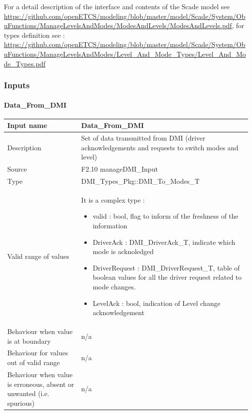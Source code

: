 For a detail description of the interface and contents of the Scade model see \url{https://github.com/openETCS/modeling/blob/master/model/Scade/System/ObuFunctions/ManageLevelsAndModes/ModesAndLevels/ModesAndLevels.pdf}, for types definition see : \url{https://github.com/openETCS/modeling/blob/master/model/Scade/System/ObuFunctions/ManageLevelsAndModes/Level_And_Mode_Types/Level_And_Mode_Types.pdf}

\subsubsection{Inputs}\label{s:mode_and_level_inputs}



\paragraph{Data\_From\_DMI}

\begin{longtable}{p{}p{}}
\toprule
Input name				& Data\_From\_DMI \\
\midrule
Description				& Set of data transmitted from DMI  (driver acknowledgements and requests to  switch modes and level) \\
\midrule
Source					& F2.10 manageDMI\_Input \\ 
\midrule
Type					& DMI\_Types\_Pkg::DMI\_To\_Modes\_T \\
\midrule
Valid range of values	& It is a complex type : 
\begin{itemize}
\item valid :  bool,  flag to inform of the freshness of the information
\item DriverAck : DMI\_DriverAck\_T, indicate which mode is acknoledged
\item DriverRequest : DMI\_DriverRequest\_T, table of boolean values for all the driver request related to  mode changes.
\item LevelAck : bool, indication of Level  change acknowledgement
\end{itemize} \\
\midrule
Behaviour when value is at boundary	& n/a \\ 
\midrule
Behaviour for values out of valid range	& n/a \\ 
\midrule
Behaviour when value is erroneous, absent or unwanted (i.e. spurious) & n/a \\ 
\bottomrule
\end{longtable}

